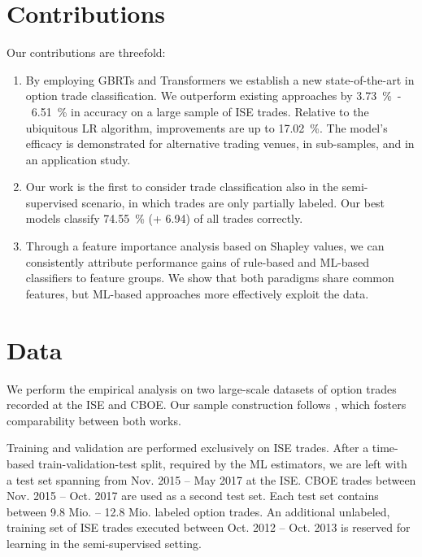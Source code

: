 \section{Contributions}

Our contributions are threefold: 
\begin{enumerate}[label=(\roman*),noitemsep]
\item By employing \glspl{GBRT} and Transformers we establish a new state-of-the-art in option trade classification. We outperform existing approaches by \SI{3.73}{\percent}~-~\SI{6.51}{\percent} in accuracy on a large sample of \gls{ISE} trades. Relative to the ubiquitous \gls{LR} algorithm, improvements are up to \SI{17.02}{\percent}. 
The model's efficacy is demonstrated for alternative trading venues, in sub-samples, and in an application study.
\item Our work is the first to consider trade classification also in the semi-supervised scenario, in which trades are only partially labeled. Our best models classify \SI{74.55}{\percent} (+ 6.94) of all trades correctly.
\item Through a feature importance analysis based on Shapley values, we can consistently attribute performance gains of rule-based and \gls{ML}-based classifiers to feature groups. We show that both paradigms share common features, but \gls{ML}-based approaches more effectively exploit the data.
\end{enumerate}

\section{Data}

We perform the empirical analysis on two large-scale datasets of option trades recorded at the \gls{ISE} and \gls{CBOE}. Our sample construction follows \textcite[][]{grauerOptionTradeClassification2022}, which fosters comparability between both works. 

Training and validation are performed exclusively on \gls{ISE} trades. After a time-based train-validation-test split, required by the \gls{ML} estimators, we are left with a test set spanning from Nov. 2015 -- May 2017 at the \gls{ISE}. \gls{CBOE} trades between Nov. 2015 -- Oct. 2017 are used as a second test set. Each test set contains between 9.8 Mio. --  12.8 Mio. labeled option trades. An additional unlabeled, training set of \gls{ISE} trades executed between Oct. 2012 -- Oct. 2013 is reserved for learning in the semi-supervised setting.

